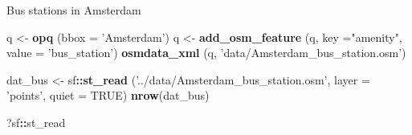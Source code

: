 \documentclass[ignorenonframetext,]{beamer}
\newenvironment{Shaded}{\begin{snugshade}}{\end{snugshade}}
\newcommand{\DataTypeTok}[1]{\textcolor[rgb]{0.13,0.29,0.53}{#1}}
\newcommand{\KeywordTok}[1]{\textcolor[rgb]{0.13,0.29,0.53}{\textbf{#1}}}
\newcommand{\NormalTok}[1]{#1}
\newcommand{\OperatorTok}[1]{\textcolor[rgb]{0.81,0.36,0.00}{\textbf{#1}}}
\newcommand{\OtherTok}[1]{\textcolor[rgb]{0.56,0.35,0.01}{#1}}
\newcommand{\StringTok}[1]{\textcolor[rgb]{0.31,0.60,0.02}{#1}}
\begin{document}
\begin{frame}[fragile]{Bus stations in Amsterdam}
\protect\hypertarget{bus-stations-in-amsterdam}{}

\begin{Shaded}
\begin{Highlighting}[]
\NormalTok{q <-}\StringTok{ }\KeywordTok{opq}\NormalTok{ (}\DataTypeTok{bbox =} \StringTok{'Amsterdam'}\NormalTok{)}
\NormalTok{q <-}\StringTok{ }\KeywordTok{add_osm_feature}\NormalTok{ (q, }\DataTypeTok{key =}\StringTok{"amenity"}\NormalTok{,}
                      \DataTypeTok{value =} \StringTok{'bus_station'}\NormalTok{) }
\KeywordTok{osmdata_xml}\NormalTok{ (q, }\StringTok{'data/Amsterdam_bus_station.osm'}\NormalTok{)}
\end{Highlighting}
\end{Shaded}

\begin{Shaded}
\begin{Highlighting}[]
\NormalTok{dat_bus <-}\StringTok{ }\NormalTok{sf}\OperatorTok{::}\KeywordTok{st_read}\NormalTok{ (}\StringTok{'../data/Amsterdam_bus_station.osm'}\NormalTok{, }
                        \DataTypeTok{layer =} \StringTok{'points'}\NormalTok{, }\DataTypeTok{quiet =} \OtherTok{TRUE}\NormalTok{)}
\KeywordTok{nrow}\NormalTok{(dat_bus)}
\end{Highlighting}
\end{Shaded}

\begin{Shaded}
\begin{Highlighting}[]
\NormalTok{?sf}\OperatorTok{::}\NormalTok{st_read}
\end{Highlighting}
\end{Shaded}

\end{frame}
\end{document}
